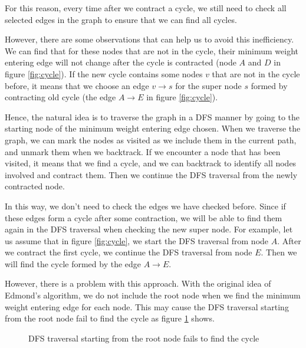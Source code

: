 \documentclass[a4paper,12pt]{article}
\begin{document}
For this reason, every time after we contract a cycle, we still need to check all selected edges in the graph to ensure that we can find all cycles.

However, there are some observations that can help us to avoid this inefficiency.
We can find that for these nodes that are not in the cycle, their minimum weight entering edge will not change after the cycle is contracted (node $A$ and $D$ in figure \ref{fig:cycle}).
If the new cycle contains some nodes $v$ that are not in the cycle before, it means that we choose an edge $v \rightarrow s$ for the super node $s$ formed by contracting old cycle (the edge $A \rightarrow E$ in figure \ref{fig:cycle}).

Hence, the natural idea is to traverse the graph in a DFS manner by going to the starting node of the minimum weight entering edge chosen.
When we traverse the graph, we can mark the nodes as visited as we include them in the current path, and unmark them when we backtrack.
If we encounter a node that has been visited, it means that we find a cycle, and we can backtrack to identify all nodes involved and contract them.
Then we continue the DFS traversal from the newly contracted node.

In this way, we don't need to check the edges we have checked before.
Since if these edges form a cycle after some contraction, we will be able to find them again in the DFS traversal when checking the new super node.
For example, let us assume that in figure \ref{fig:cycle}, we start the DFS traversal from node $A$.
After we contract the first cycle, we continue the DFS traversal from node $E$.
Then we will find the cycle formed by the edge $A \rightarrow E$.

However, there is a problem with this approach.
With the original idea of Edmond's algorithm, we do not include the root node when we find the minimum weight entering edge for each node.
This may cause the DFS traversal starting from the root node fail to find the cycle as figure \ref{fig:fail} shows.

\begin{figure}[H]
	\centering
	\caption{DFS traversal starting from the root node fails to find the cycle}
	\label{fig:fail}
\end{figure}
\end{document}
